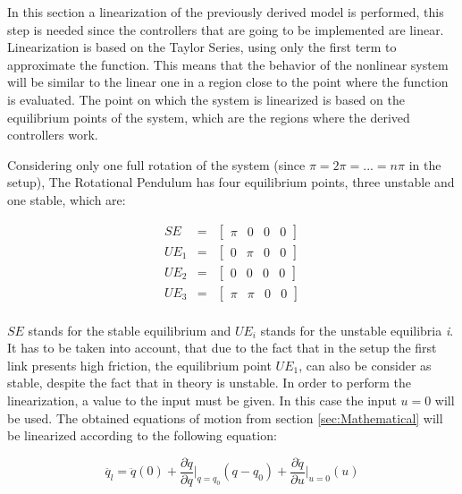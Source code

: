 \documentclass[main.tex]{subfiles}
\begin{document}
	
\vspace{20pt}

In this section a linearization of the previously derived model is performed, this step is needed since the controllers that are going to be implemented are linear. Linearization is based on the Taylor Series, using only the first term to approximate the function. This means that the behavior of the nonlinear system will be similar to the linear one in a region close to the point where the function is evaluated. The point on which the system is linearized is based on the equilibrium points of the system, which are the regions where the derived controllers work. 

Considering only one full rotation of the system (since $\pi=2\pi=...=n\pi$ in the setup), The Rotational Pendulum has four equilibrium points, three unstable and one stable, which are:

\begin{eqnarray}
SE &=& \begin{bmatrix}
\pi & 0 & 0 & 0
\end{bmatrix} \nonumber \\
UE_1 &=& \begin{bmatrix}
0 & \pi & 0 & 0
\end{bmatrix} \nonumber \\
UE_2 &=& \begin{bmatrix}
0 & 0 & 0 & 0
\end{bmatrix} \nonumber \\
UE_3 &=& \begin{bmatrix}
\pi & \pi & 0 & 0
\end{bmatrix} \nonumber \\
\end{eqnarray}

$SE$  stands for the stable equilibrium and $UE_i$  stands for the unstable equilibria \textit{i}. It has to be taken into account, that due to the fact that in the setup the first link presents high friction, the equilibrium point $UE_1$, can also be consider as stable, despite the fact that in theory is unstable. In order to perform the linearization, a value to the input must be given. In this case the input $u=0$ will be used. The obtained equations of motion from section \ref{sec:Mathematical} will be linearized according to the following equation:

\begin{equation}
\ddot{q_l} = \ddot{q}(0) +
			 \frac{\partial \ddot{q}}{\partial q}\bigg\vert_{q = q_0}(q-q_0) +
             \frac{\partial \ddot{q}}{\partial u}\bigg\vert_{u = 0}(u)
\end{equation}
\end{document}
